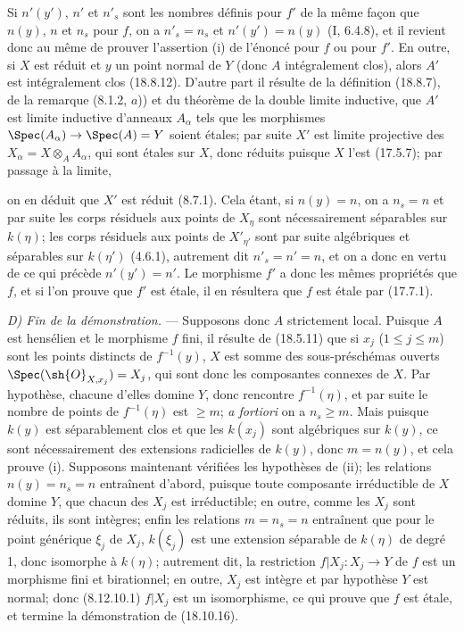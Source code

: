 Si $n'(y')$, $n'$ et $n'_s$ sont les nombres définis pour $f'$ de la même façon que $n(y)$, $n$ et $n_s$ pour $f$, on a $n'_s=n_s$ et $n'(y')=n(y)$ (I, 6.4.8), et il revient donc au même de prouver l'assertion (i) de l'énoncé pour $f$ ou pour $f'$. En outre, si $X$ est réduit et $y$ un point normal de $Y$ (donc $A$ intégralement clos), alors $A'$ est intégralement clos (18.8.12). D'autre part il résulte de la définition (18.8.7), de la remarque (8.1.2, $a$)) et du théorème de la double limite inductive, que $A'$ est limite inductive d'anneaux $A_\alpha$ tels que les morphismes $\Spec(A_\alpha)\to\Spec(A)=Y$ soient étales; par suite $X'$ est limite projective des $X_\alpha=X\otimes_A A_\alpha$, qui sont étales sur $X$, donc réduits puisque $X$ l'est (17.5.7); par passage à la limite,


on en déduit que $X'$ est réduit (8.7.1). Cela étant, si $n(y)=n$, on a $n_s=n$ et par suite les corps résiduels aux points de $X_\eta$ sont nécessairement séparables sur $k(\eta)$; les corps résiduels aux points de $X'_{\eta'}$ sont par suite algébriques et séparables sur $k(\eta')$ (4.6.1), autrement dit $n'_s=n'=n$, et on a donc en vertu de ce qui précède $n'(y')=n'$. Le morphisme $f'$ a donc les mêmes propriétés que $f$, et si l'on prouve que $f'$ est étale, il en résultera que $f$ est étale par (17.7.1).

\emph{D) Fin de la démonstration.} --- Supposons donc $A$ strictement local. Puisque $A$ est hensélien et le morphisme $f$ fini, il résulte de (18.5.11) que si $x_j$ ($1\leq j\leq m$) sont les points distincts de $f^{-1}(y)$, $X$ est somme des sous-préschémas ouverts $\Spec(\sh{O}_{X,x_j})=X_j$, qui sont donc les composantes connexes de $X$. Par hypothèse, chacune d'elles domine $Y$, donc rencontre $f^{-1}(\eta)$, et par suite le nombre de points de $f^{-1}(\eta)$ est $\geq m$; \emph{a fortiori} on a $n_s\geq m$. Mais puisque $k(y)$ est séparablement clos et que les $k(x_j)$ sont algébriques sur $k(y)$, ce sont nécessairement des extensions radicielles de $k(y)$, donc $m=n(y)$, et cela prouve (i). Supposons maintenant vérifiées les hypothèses de (ii); les relations $n(y)=n_s=n$ entraînent d'abord, puisque toute composante irréductible de $X$ domine $Y$, que chacun des $X_j$ est irréductible; en outre, comme les $X_j$ sont réduits, ils sont intègres; enfin les relations $m=n_s=n$ entraînent que pour le point générique $\xi_j$ de $X_j$, $k(\xi_j)$ est une extension séparable de $k(\eta)$ de degré 1, donc isomorphe à $k(\eta)$; autrement dit, la restriction $f|X_j:X_j\to Y$ de $f$ est un morphisme fini et birationnel; en outre, $X_j$ est intègre et par hypothèse $Y$ est normal; donc (8.12.10.1) $f|X_j$ est un isomorphisme, ce qui prouve que $f$ est étale, et termine la démonstration de (18.10.16).

